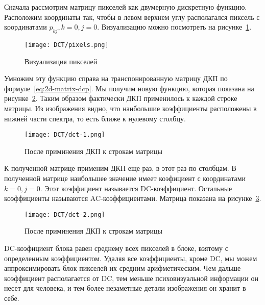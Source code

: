 Сначала рассмотрим матрицу пикселей как двумерную дискретную функцию.
Расположим координаты так, чтобы в левом верхнем углу
располагался пиксель с координатами $p_{kj}, k = 0, j = 0$.
Визуализацию можно посмотреть на рисунке~\ref{img:pixels-dct}.

\begin{figure}[ht!]
    \centering
    \caption{Визуализация пикселей}
    \texttt{[image: DCT/pixels.png]}
    \label{img:pixels-dct}
\end{figure}

Умножим эту функцию справа на транспонированную матрицу ДКП
по формуле~\ref{eq:2d-matrix-dcp}. Мы получим новую функцию,
которая показана на рисунке~\ref{img:dct-1}.
Таким образом фактически ДКП применилось к каждой строке матрицы.
Из изображения видно, что наибольшие коэффициенты расположены
в нижней части спектра, то есть ближе к нулевому столбцу.

\begin{figure}[ht!]
    \centering
    \caption{После приминения ДКП к строкам матрицы}
    \texttt{[image: DCT/dct-1.png]}
    \label{img:dct-1}
\end{figure}

К полученной матрице применим ДКП еще раз, в этот раз по столбцам.
В полученной матрице наибольшее значение имеет коэфициент с координатами
$k = 0, j = 0$. Этот коэффициент называется DC-коэффициент.
Остальные коэффициенты называются AC-коэффициентами.
Матрица показана на рисунке~\ref{img:dct-2}.

\begin{figure}[ht!]
    \centering
    \caption{После приминения ДКП к строкам матрицы}
    \texttt{[image: DCT/dct-2.png]}
    \label{img:dct-2}
\end{figure}

DC-коэфициент блока равен среднему всех пикселей в блоке,
взятому с определенным коэффициентом. Удаляя все коэффициенты,
кроме DC, мы можем аппроксимировать блок пикселей их средним
арифметическим. Чем дальше коэффициент располагается от DC,
тем меньше психовизуальной информации он несет для человека,
и тем более незаметные детали изображения он хранит в себе.